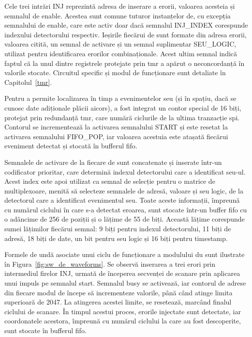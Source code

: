 \documentclass[12pt,a4paper]{report}
\begin{document}
Cele trei intrări INJ reprezintă adresa de inserare a erorii, valoarea acesteia și semnalul de enable. Acestea sunt comune tuturor instanțelor \gls{de}, cu excepția semnalului de enable, care este activ doar dacă semnalul INJ\_INDEX corespunde indexului detectorului respectiv. Ieșirile fiecărui \gls{de} sunt formate din adresa erorii, valoarea citită, un semnal de activare și un semnal suplimentar SEU\_LOGIC, utilizat pentru identificarea erorilor combinaționale. Acest ultim semnal indică faptul că la unul dintre registrele protejate prin \gls{tmr} a apărut o neconcordanță în valorile stocate. Circuitul specific și modul de funcționare sunt detaliate în Capitolul~\ref{tmr}. 

Pentru a permite localizarea în timp a evenimentelor \gls{seu} (și în spațiu, dacă se cunosc date adiționale plăcii \gls{aicors}), a fost integrat un contor special de 16 biți, protejat prin redundanță \gls{tmr}, care numără ciclurile de la ultima tranzacție \gls{spi}. Contorul se incrementează la activarea semnalului START și este resetat la activarea semnalului FIFO\_POP, iar valoarea acestuia este atașată fiecărui eveniment detectat și stocată în bufferul \gls{fifo}.

Semnalele de activare de la fiecare \gls{de} sunt concatenate și inserate într-un codificator prioritar, care determină indexul detectorului care a identificat \gls{seu}-ul. Acest index este apoi utilizat ca semnal de selecție pentru o matrice de multiplexoare, menită să selecteze semnalele de adresă, valoare și \gls{seu} logic, de la detectorul care a identificat evenimentul \gls{seu}. Toate aceste informații, împreună cu numărul ciclului în care s-a detectat eroarea, sunt stocate într-un buffer \gls{fifo} cu o adâncime de 256 de poziții și o lățime de 55 de biți. Această lățime corespunde sumei lățimilor fiecărui semnal: 9 biți pentru indexul detectorului, 11 biți de adresă, 18 biți de date, un bit pentru \gls{seu} logic și 16 biți pentru timestamp.

Formele de undă asociate unui ciclu de funcționare a modulului \gls{du} sunt ilustrate în Figura~\ref{fig:sw_de_waveforms}. Se observă inserarea a trei erori prin intermediul firelor INJ, urmată de începerea secvenței de scanare prin aplicarea unui impuls pe semnalul start. Semnalul busy se activează, iar contorul de adrese din fiecare modul \gls{de} începe să incrementeze valorile, până când atinge limita superioară de 2047. La atingerea acestei limite, se resetează, marcând finalul ciclului de scanare. În timpul acestui proces, erorile injectate sunt detectate, iar coordonatele acestora, împreună cu numărul ciclului la care au fost descoperite, sunt stocate în bufferul \gls{fifo}.
\end{document}
